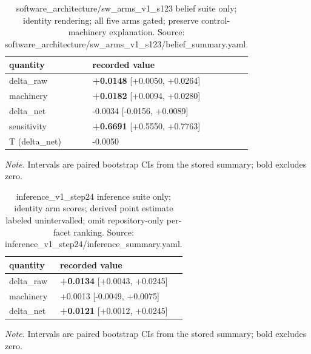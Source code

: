 \documentclass[10pt]{article}
\begin{document}
\begin{table}[H]
\centering
\footnotesize
\caption{ software\_architecture/sw\_arms\_v1\_s123 belief suite only; identity rendering; all five arms gated; preserve control-machinery explanation. Source: software\_architecture/sw\_arms\_v1\_s123/belief\_summary.yaml. }
\label{tab:belief_transfer}



\begin{tabular}{ ll }
\toprule
quantity & recorded value \\
\midrule

delta\_raw & \textbf{+0.0148} [+0.0050, +0.0264] \\

machinery & \textbf{+0.0182} [+0.0094, +0.0280] \\

delta\_net & -0.0034 [-0.0156, +0.0089] \\

sensitivity & \textbf{+0.6691} [+0.5550, +0.7763] \\

T (delta\_net) & -0.0050 \\

\bottomrule
\end{tabular}

\par\footnotesize\emph{Note.} Intervals are paired bootstrap CIs from the stored summary; bold excludes zero.
\end{table}


\begin{table}[H]
\centering
\footnotesize
\caption{ inference\_v1\_step24 inference suite only; identity arm scores; derived point estimate labeled unintervalled; omit repository-only per-facet ranking. Source: inference\_v1\_step24/inference\_summary.yaml. }
\label{tab:inference_transfer}



\begin{tabular}{ ll }
\toprule
quantity & recorded value \\
\midrule

delta\_raw & \textbf{+0.0134} [+0.0043, +0.0245] \\

machinery & +0.0013 [-0.0049, +0.0075] \\

delta\_net & \textbf{+0.0121} [+0.0012, +0.0245] \\

\bottomrule
\end{tabular}

\par\footnotesize\emph{Note.} Intervals are paired bootstrap CIs from the stored summary; bold excludes zero.
\end{table}
\end{document}
